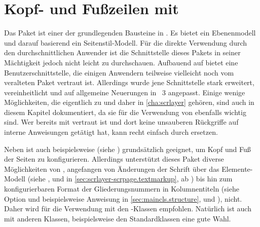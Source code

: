 \chapter[{Kopf- und Fußzeilen mit \Package{scrlayer-scrpage}}]
  {Kopf- und Fußzeilen mit
    }
%
\BeginIndexGroup%
%
Das Paket \hyperref[cha:scrlayer]{}%
%
 ist einer der grundlegenden Bausteine in
\KOMAScript{}. Es bietet ein Ebenenmodell und darauf basierend ein
Seitenstil-Modell. Für die direkte Verwendung durch den durchschnittlichen
Anwender ist die Schnittstelle dieses Pakets in seiner Mächtigkeit jedoch
nicht leicht zu durchschauen.  Aufbauend auf
\hyperref[cha:scrlayer]{} bietet
 eine
Benutzerschnittstelle, die einigen Anwendern teilweise vielleicht noch vom
veralteten Paket
vertraut ist. Allerdings wurde jene Schnittstelle stark erweitert,
vereinheitlicht und auf allgemeine Neuerungen in \KOMAScript~3 angepasst.
Einige wenige Möglichkeiten, die eigentlich zu
\hyperref[cha:scrlayer]{} und daher in
\autoref{cha:scrlayer} gehören, sind auch in diesem Kapitel dokumentiert, da
sie für die Verwendung von  ebenfalls wichtig
sind. Wer bereits mit  vertraut ist und dort keine
unsauberen Rückgriffe auf interne Anweisungen getätigt hat, kann %
\iffalse in der Regel \fi%
 recht einfach durch  ersetzen.

Neben  ist auch beispielsweise
%
 (siehe \cite{package:fancyhdr})
grundsätzlich geeignet, um Kopf und Fuß der Seiten zu
konfigurieren. Allerdings unterstützt dieses Paket diverse
Möglichkeiten von \KOMAScript{}, angefangen von Änderungen der Schrift über
das Elemente-Modell (siehe ,
 und
 in
\autoref{sec:scrlayer-scrpage.textmarkup}, ab
) bis hin zum konfigurierbaren Format
der Gliederungsnummern in Kolumnentiteln (siehe Option
 und beispielsweise Anweisung
 in \autoref{sec:maincls.structure},
 und
),
nicht. Daher wird für die Verwendung mit den
\KOMAScript-Klassen  empfohlen. Natürlich ist
 auch mit anderen Klassen, beispielsweise den
Standardklassen eine gute Wahl.

